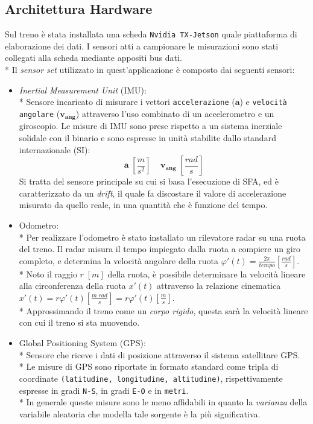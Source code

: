 \subsection{Architettura Hardware}
Sul treno \`e stata installata una scheda \texttt{Nvidia TX-Jetson} quale piattaforma di elaborazione dei dati. I sensori atti a campionare le misurazioni sono stati collegati alla scheda mediante appositi bus dati.\\*
Il \emph{sensor set} utilizzato in quest'applicazione \`e composto dai seguenti sensori:
\begin{itemize}
	\item \emph{Inertial Measurement Unit} (IMU):\\*
	Sensore incaricato di misurare i vettori \texttt{accelerazione} ($\mathbf{a}$) e \texttt{velocit\`a angolare} ($\mathbf{v_{ang}}$) attraverso l'uso combinato di un accelerometro e un giroscopio. Le misure di IMU sono prese rispetto a un sistema inerziale solidale con il binario e sono espresse in unit\`a stabilite dallo standard internazionale (SI):
	$$
	\mathbf{a}\;\left[\frac{m}{s^2}\right]\;\;\;\;\mathbf{v_{ang}}\;\left[ \frac{rad}{s} \right]
	$$Si tratta del sensore principale su cui si basa l'esecuzione di SFA, ed \`e caratterizzato da un \emph{drift}, il quale fa discostare il valore di accelerazione misurato da quello reale, in una quantit\`a che \`e funzione del tempo.\newpage
	\item Odometro:\\*
	Per realizzare l'odometro \`e stato installato un rilevatore radar su una ruota del treno. Il radar misura il tempo impiegato dalla ruota a compiere un giro completo, e determina la velocit\`a angolare della ruota $\varphi'(t) = \frac{2\pi}{tempo} \left[ \frac{rad}{s}\right]$.\\*
	Noto il raggio $r\;[m]$ della ruota, \`e possibile determinare la velocit\`a lineare alla circonferenza della ruota  $x'(t)$ attraverso la relazione cinematica $x'(t) = r\varphi'(t) \left[ \frac{m\;rad}{s}\right] = r\varphi'(t) \left[ \frac{m}{s} \right]$.\\*
	Approssimando il treno come un \emph{corpo rigido}, questa sar\`a la velocit\`a lineare con cui il treno si sta muovendo.
	\item Global Positioning System (GPS):\\*
	Sensore che riceve i dati di posizione attraverso il sistema satellitare GPS.\\*
	Le misure di GPS sono riportate in formato standard come tripla di coordinate \texttt{(latitudine, longitudine, altitudine)}, rispettivamente espresse in gradi \texttt{N-S}, in gradi \texttt{E-O} e in \texttt{metri}.\\*
	In generale queste misure sono le meno affidabili in quanto la \emph{varianza} della variabile aleatoria che modella tale sorgente \`e la pi\`u significativa.
\end{itemize}
